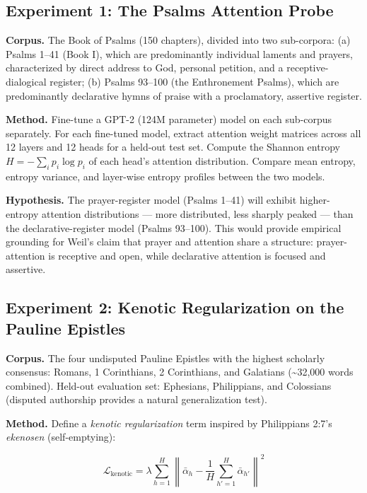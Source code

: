 \documentclass[10pt, letterpaper, twocolumn]{article}
\begin{document}
\subsection*{Experiment 1: The Psalms Attention Probe}\label{experiment-1-the-psalms-attention-probe}

\textbf{Corpus.} The Book of Psalms (150 chapters), divided into two sub-corpora: (a) Psalms 1--41 (Book I), which are predominantly individual laments and prayers, characterized by direct address to God, personal petition, and a receptive-dialogical register; (b) Psalms 93--100 (the Enthronement Psalms), which are predominantly declarative hymns of praise with a proclamatory, assertive register.

\textbf{Method.} Fine-tune a GPT-2 (124M parameter) model on each sub-corpus separately. For each fine-tuned model, extract attention weight matrices across all 12 layers and 12 heads for a held-out test set. Compute the Shannon entropy \(H = -\sum_i p_i \log p_i\) of each head's attention distribution. Compare mean entropy, entropy variance, and layer-wise entropy profiles between the two models.

\textbf{Hypothesis.} The prayer-register model (Psalms 1--41) will exhibit higher-entropy attention distributions --- more distributed, less sharply peaked --- than the declarative-register model (Psalms 93--100). This would provide empirical grounding for Weil's claim that prayer and attention share a structure: prayer-attention is receptive and open, while declarative attention is focused and assertive.

\subsection*{Experiment 2: Kenotic Regularization on the Pauline Epistles}\label{experiment-2-kenotic-regularization-on-the-pauline-epistles}

\textbf{Corpus.} The four undisputed Pauline Epistles with the highest scholarly consensus: Romans, 1 Corinthians, 2 Corinthians, and Galatians (\textasciitilde32,000 words combined). Held-out evaluation set: Ephesians, Philippians, and Colossians (disputed authorship provides a natural generalization test).

\textbf{Method.} Define a \emph{kenotic regularization} term inspired by Philippians 2:7's \emph{ekenosen} (self-emptying):

\[\mathcal{L}_{\text{kenotic}} = \lambda \sum_{h=1}^{H} \left\| \bar{\alpha}_h - \frac{1}{H}\sum_{h'=1}^{H} \bar{\alpha}_{h'} \right\|^2\]
\end{document}
